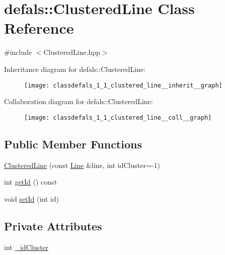 \hypertarget{classdefals_1_1_clustered_line}{}\section{defals\+:\+:Clustered\+Line Class Reference}
\label{classdefals_1_1_clustered_line}


{\ttfamily \#include $<$Clustered\+Line.\+hpp$>$}



Inheritance diagram for defals\+:\+:Clustered\+Line\+:\nopagebreak
\begin{figure}[H]
\begin{center}
\leavevmode
\texttt{[image: classdefals\_1\_1\_clustered\_line\_\_inherit\_\_graph]}
\end{center}
\end{figure}


Collaboration diagram for defals\+:\+:Clustered\+Line\+:\nopagebreak
\begin{figure}[H]
\begin{center}
\leavevmode
\texttt{[image: classdefals\_1\_1\_clustered\_line\_\_coll\_\_graph]}
\end{center}
\end{figure}
\subsection*{Public Member Functions}
\begin{DoxyCompactItemize}
\item 
\hyperlink{classdefals_1_1_clustered_line_abf262f1f99c32a3c1ded4242fb4aebdb}{Clustered\+Line} (const \hyperlink{classdefals_1_1_line}{Line} \&line, int id\+Cluster=-\/1)
\item 
int \hyperlink{classdefals_1_1_clustered_line_ade69f8e5a4c50da47d58fef43ca73f50}{get\+Id} () const
\item 
void \hyperlink{classdefals_1_1_clustered_line_a3532895ad86a79d66a8a0b56a967d765}{set\+Id} (int id)
\end{DoxyCompactItemize}
\subsection*{Private Attributes}
\begin{DoxyCompactItemize}
\item 
int \hyperlink{classdefals_1_1_clustered_line_a63572edec61c742881722ceccc3bee7c}{\+\_\+id\+Cluster}
\end{DoxyCompactItemize}


